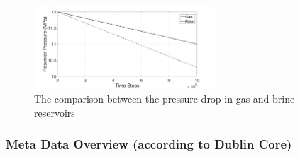 \begin{figure}[!ht]
\centering
\includegraphics[width=0.6\textwidth]{figures/Amir_ME4_Pressure_Data.png}
\caption{The comparison between the pressure drop in gas and brine reservoirs}
\label{fig:Amir_ME4_Pressure_Data}
\end{figure}


\clearpage
\subsubsection*{Meta Data Overview (according to Dublin Core)}

